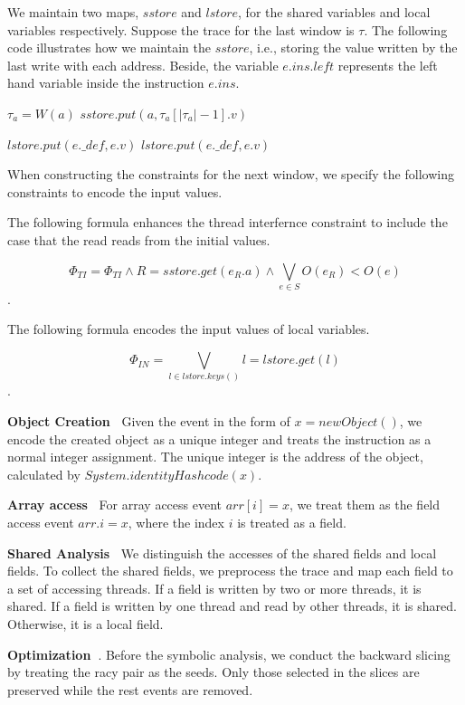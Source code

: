 We maintain two maps,  $sstore$ and $lstore$, for the shared variables and local variables respectively. Suppose the trace for the last window is $\tau$. The following code illustrates how we maintain the $sstore$, i.e., storing the value written by the last write with each address. Beside, the variable $e.ins.left$ represents the left hand variable inside the instruction $e.ins$.

\begin{algorithmic}[3]
 \State $\tau_a=W(a)$
 \State $sstore.put(a,\tau_a[|\tau_a|-1].v)$ 
\EndFor
\end{algorithmic}

\begin{algorithmic}[3]
    \State $ lstore.put(e.\_def, e.v)$
  \Else
        \State $ lstore.put(e.\_def, e.v)$
     \EndIf
  \EndIf 
\EndFor
\end{algorithmic}


When constructing the constraints for the next window, we specify the following constraints to encode the input values.

The following formula enhances the thread interfernce constraint to include the case that the read reads from the initial values. 

$$\Phi_{TI}=\Phi_{TI} \wedge  R=sstore.get(e_R.a) \wedge \bigvee_{e\in S} O(e_R)<O(e)$$.

The following formula encodes the input values of local variables. 

$$\Phi_{IN}=\bigvee_{l\in lstore.keys()} l=lstore.get(l)$$.
 

{\bf Object Creation\ } Given the event in the form of $x=new Object()$, we encode the created object as a unique integer and treats the instruction as a normal integer assignment. The unique integer is the address of the object, calculated by $System.identityHashcode(x)$.


{\bf Array access\ } For array access event $arr[i]=x$, we treat them as the field access event $arr.i=x$, where the index $i$ is treated as a field. 

{\bf Shared Analysis\ } We distinguish the accesses of the shared fields and local fields. To collect the shared fields, we preprocess the trace and map each field to a set of accessing threads. If a field is written by two or more threads, it is shared. If a field is written by one thread and read by other threads, it is shared. Otherwise, it is a local field. 

{\bf Optimization\ }. Before the symbolic analysis, we conduct the backward slicing by treating the racy pair as the seeds. Only those selected in the slices are preserved while the rest events are removed. 

